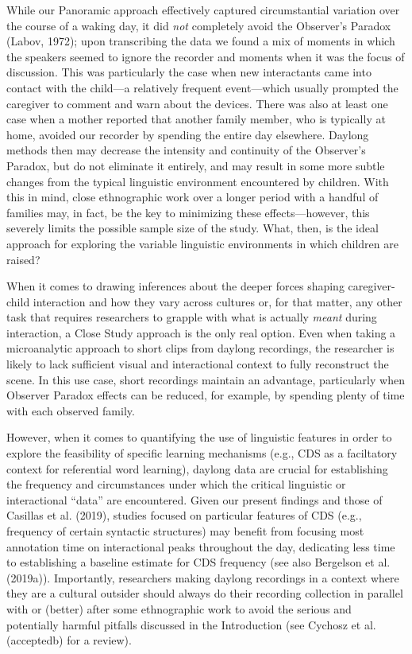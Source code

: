 \documentclass[,man,mask,floatsintext]{apa6}
\begin{document}
While our Panoramic approach effectively captured circumstantial
variation over the course of a waking day, it did \emph{not} completely
avoid the Observer's Paradox (Labov, 1972); upon transcribing the data
we found a mix of moments in which the speakers seemed to ignore the
recorder and moments when it was the focus of discussion. This was
particularly the case when new interactants came into contact with the
child---a relatively frequent event---which usually prompted the
caregiver to comment and warn about the devices. There was also at least
one case when a mother reported that another family member, who is
typically at home, avoided our recorder by spending the entire day
elsewhere. Daylong methods then may decrease the intensity and
continuity of the Observer's Paradox, but do not eliminate it entirely,
and may result in some more subtle changes from the typical linguistic
environment encountered by children. With this in mind, close
ethnographic work over a longer period with a handful of families may,
in fact, be the key to minimizing these effects---however, this severely
limits the possible sample size of the study. What, then, is the ideal
approach for exploring the variable linguistic environments in which
children are raised?

When it comes to drawing inferences about the deeper forces shaping
caregiver-child interaction and how they vary across cultures or, for
that matter, any other task that requires researchers to grapple with
what is actually \emph{meant} during interaction, a Close Study approach
is the only real option. Even when taking a microanalytic approach to
short clips from daylong recordings, the researcher is likely to lack
sufficient visual and interactional context to fully reconstruct the
scene. In this use case, short recordings maintain an advantage,
particularly when Observer Paradox effects can be reduced, for example,
by spending plenty of time with each observed family.

However, when it comes to quantifying the use of linguistic features in
order to explore the feasibility of specific learning mechanisms (e.g.,
CDS as a faciltatory context for referential word learning), daylong
data are crucial for establishing the frequency and circumstances under
which the critical linguistic or interactional \enquote{data} are
encountered. Given our present findings and those of Casillas et al.
(2019), studies focused on particular features of CDS (e.g., frequency
of certain syntactic structures) may benefit from focusing most
annotation time on interactional peaks throughout the day, dedicating
less time to establishing a baseline estimate for CDS frequency (see
also Bergelson et al. (2019a)). Importantly, researchers making daylong
recordings in a context where they are a cultural outsider should always
do their recording collection in parallel with or (better) after some
ethnographic work to avoid the serious and potentially harmful pitfalls
discussed in the Introduction (see Cychosz et al. (acceptedb) for a
review).
\end{document}
